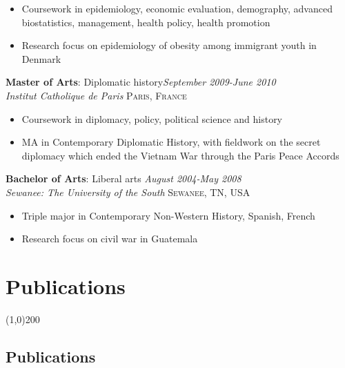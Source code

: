 \documentclass[11pt]{article}
\begin{document}
\vspace{-2mm}
\begin{itemize}\itemsep0pt \parskip0pt 
\item Coursework in epidemiology, economic evaluation, demography, advanced biostatistics, management, health policy, health promotion
\item Research focus on epidemiology of obesity among immigrant youth in Denmark 
\end{itemize}


\noindent \textbf{Master of Arts}: Diplomatic history\hfill \emph{September 2009-June 2010}\\
\noindent \emph{Institut Catholique de Paris} \hfill \textsc{Paris, France}
\vspace{-2mm}
\begin{itemize}\itemsep0pt \parskip0pt 
\item Coursework in diplomacy, policy, political science and history
\item MA in Contemporary Diplomatic History, with fieldwork on the secret diplomacy which ended the Vietnam War through the Paris Peace Accords
\end{itemize}

\noindent \textbf{Bachelor of Arts}: Liberal arts \hfill \emph{August 2004-May 2008}\\
\noindent \emph{Sewanee: The University of the South} \hfill \textsc{Sewanee, TN, USA}
\vspace{-2mm}
\begin{itemize}\itemsep0pt \parskip0pt 
\item Triple major in Contemporary Non-Western History, Spanish, French
\item Research focus on civil war in Guatemala
\end{itemize}


\newpage

\section*{Publications} %
\vspace{-7mm}
\line(1,0){200}
\vspace{2mm}


\subsection*{Publications}
\end{document}
